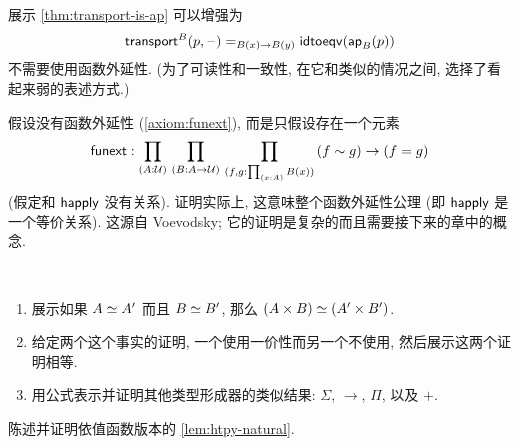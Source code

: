 \begin{ex}
    \label{ex:strengthen-transport-is-ap}
    展示 \cref{thm:transport-is-ap} 可以增强为
    \[\mathsf{transport}^{B}(p,{\mathord{\hspace{1pt}\text{--}\hspace{1pt}}}) =_{B(x)\to B(y)} \mathsf{idtoeqv}(\mathsf{ap}_{B}(p))\]
    不需要使用函数外延性.
    (为了可读性和一致性, 在它和类似的情况之间, 选择了看起来弱的表述方式.)
\end{ex}

\begin{ex}
    \label{ex:strong-from-weak-funext}
    假设没有函数外延性 (\cref{axiom:funext}), 而是只假设存在一个元素
    \[ \funext : \prd{A:\UU}{B:A\to \UU}{f,g:\prd{x:A} B(x)} (f\htpy g) \to (f=g) \]
    (假定和 $\mathsf{happly}$ 没有关系).
    证明实际上, 这意味整个函数外延性公理 (即 $\mathsf{happly}$ 是一个等价关系).
    这源自 Voevodsky; 它的证明是复杂的而且需要接下来的章中的概念.
\end{ex}

\begin{ex}
    \label{ex:equiv-functor-types}\
    \begin{enumerate}
        \item 展示如果 $A \simeq A'$  而且 $B \simeq B'$, 那么 $(A\times B) \simeq (A'\times B')$.
        \item 给定两个这个事实的证明, 一个使用一价性而另一个不使用, 然后展示这两个证明相等.
        \item 用公式表示并证明其他类型形成器的类似结果: $\Sigma$, $\to$, $\Pi$, 以及 $+$.
    \end{enumerate}
\end{ex}

\begin{ex}
    \label{ex:dep-htpy-natural}
    陈述并证明依值函数版本的 \cref{lem:htpy-natural}.
\end{ex}